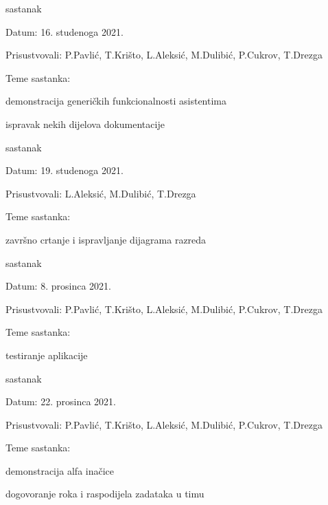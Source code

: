 \begin{packed_enum}
			\item  sastanak
			\item[] \begin{packed_item}
				\item Datum: 16. studenoga 2021.
				\item Prisustvovali: P.Pavlić, T.Krišto, L.Aleksić, M.Dulibić, P.Cukrov, T.Drezga
				\item Teme sastanka:
				\begin{packed_item}
					\item demonstracija generičkih funkcionalnosti asistentima
					\item ispravak nekih dijelova dokumentacije
				\end{packed_item}
			\end{packed_item}
			
			\item  sastanak
			\item[] \begin{packed_item}
				\item Datum: 19. studenoga 2021.
				\item Prisustvovali: L.Aleksić, M.Dulibić, T.Drezga
				\item Teme sastanka:
				\begin{packed_item}
					\item završno crtanje i ispravljanje dijagrama razreda
				\end{packed_item}
			\end{packed_item}
			
			\item  sastanak
			\item[] \begin{packed_item}
				\item Datum: 8. prosinca 2021.
				\item Prisustvovali: P.Pavlić, T.Krišto, L.Aleksić, M.Dulibić, P.Cukrov, T.Drezga
				\item Teme sastanka:
				\begin{packed_item}
					\item testiranje aplikacije
				\end{packed_item}
			\end{packed_item}
						
			\item  sastanak
			\item[] \begin{packed_item}
				\item Datum: 22. prosinca 2021.
				\item Prisustvovali: P.Pavlić, T.Krišto, L.Aleksić, M.Dulibić, P.Cukrov, T.Drezga
				\item Teme sastanka:
				\begin{packed_item}
					\item demonstracija alfa inačice
					\item dogovoranje roka i raspodijela zadataka u timu
				\end{packed_item}
			\end{packed_item}
			

\end{packed_enum}
